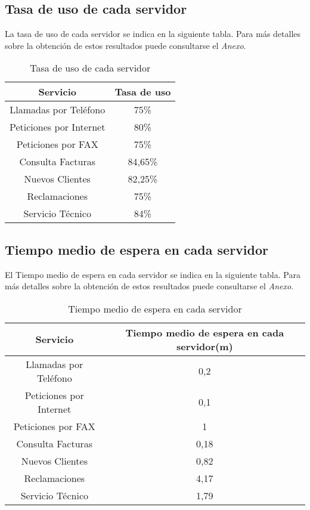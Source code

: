 \subsection{Tasa de uso de cada servidor}
La tasa de uso de cada servidor se indica en la siguiente tabla. Para más detalles sobre la obtención de estos resultados puede consultarse el \textit{Anexo}.\\
\begin{table}[H]
  \begin{center}
  \begin{tabular}{|c|c|}
    \hline
    \textbf{Servicio}       & \textbf{Tasa de uso} \\ \hline
    Llamadas por Teléfono   & 75\%                   \\ \hline
    Peticiones por Internet & 80\%                  \\ \hline
    Peticiones por FAX      & 75\%                   \\ \hline
    Consulta Facturas      & 84,65\%                   \\ \hline
    Nuevos Clientes      & 82,25\%                   \\ \hline
    Reclamaciones      & 75\%                   \\ \hline
    Servicio Técnico      & 84\%                  \\ \hline
  \end{tabular}
\end{center}
  \caption{Tasa de uso de cada servidor}
  \end{table}
\subsection{Tiempo medio de espera en cada servidor}
El Tiempo medio de espera en cada servidor se indica en la siguiente tabla. Para más detalles sobre la obtención de estos resultados puede consultarse el \textit{Anexo}.\\
\begin{table}[H]
  \begin{center}
  \begin{tabular}{|c|c|}
    \hline
    \textbf{Servicio}       & \textbf{Tiempo medio de espera en cada servidor(m)} \\ \hline
    Llamadas por Teléfono   & 0,2                   \\ \hline
    Peticiones por Internet & 0,1                  \\ \hline
    Peticiones por FAX      & 1                   \\ \hline
    Consulta Facturas      & 0,18                   \\ \hline
    Nuevos Clientes      & 0,82                   \\ \hline
    Reclamaciones      & 4,17                   \\ \hline
    Servicio Técnico      & 1,79                   \\ \hline
  \end{tabular}
\end{center}
  \caption{Tiempo medio de espera en cada servidor}
  \end{table}
